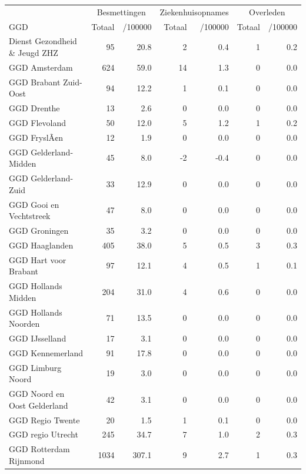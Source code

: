 \documentclass[
  english,
  man,floatsintext]{apa6}
\begin{document}
\begin{table}[H]
\centering\begingroup\fontsize{10}{12}\selectfont

\begin{threeparttable}
\begin{tabular}{lrrrrrr}
\toprule
\multicolumn{1}{c}{ } & \multicolumn{2}{c}{Besmettingen} & \multicolumn{2}{c}{Ziekenhuisopnames} & \multicolumn{2}{c}{Overleden} \\
\cmidrule(l{3pt}r{3pt}){2-3} \cmidrule(l{3pt}r{3pt}){4-5} \cmidrule(l{3pt}r{3pt}){6-7}
GGD & Totaal & /100000 & Totaal & /100000 & Totaal & /100000\\
\midrule
Dienst Gezondheid \& Jeugd ZHZ & 95 & 20.8 & 2 & 0.4 & 1 & 0.2\\
GGD Amsterdam & 624 & 59.0 & 14 & 1.3 & 0 & 0.0\\
GGD Brabant Zuid-Oost & 94 & 12.2 & 1 & 0.1 & 0 & 0.0\\
GGD Drenthe & 13 & 2.6 & 0 & 0.0 & 0 & 0.0\\
GGD Flevoland & 50 & 12.0 & 5 & 1.2 & 1 & 0.2\\
GGD FryslÃ¢n & 12 & 1.9 & 0 & 0.0 & 0 & 0.0\\
GGD Gelderland-Midden & 45 & 8.0 & -2 & -0.4 & 0 & 0.0\\
GGD Gelderland-Zuid & 33 & 12.9 & 0 & 0.0 & 0 & 0.0\\
GGD Gooi en Vechtstreek & 47 & 8.0 & 0 & 0.0 & 0 & 0.0\\
GGD Groningen & 35 & 3.2 & 0 & 0.0 & 0 & 0.0\\
GGD Haaglanden & 405 & 38.0 & 5 & 0.5 & 3 & 0.3\\
GGD Hart voor Brabant & 97 & 12.1 & 4 & 0.5 & 1 & 0.1\\
GGD Hollands Midden & 204 & 31.0 & 4 & 0.6 & 0 & 0.0\\
GGD Hollands Noorden & 71 & 13.5 & 0 & 0.0 & 0 & 0.0\\
GGD IJsselland & 17 & 3.1 & 0 & 0.0 & 0 & 0.0\\
GGD Kennemerland & 91 & 17.8 & 0 & 0.0 & 0 & 0.0\\
GGD Limburg Noord & 19 & 3.0 & 0 & 0.0 & 0 & 0.0\\
GGD Noord en Oost Gelderland & 42 & 3.1 & 0 & 0.0 & 0 & 0.0\\
GGD Regio Twente & 20 & 1.5 & 1 & 0.1 & 0 & 0.0\\
GGD regio Utrecht & 245 & 34.7 & 7 & 1.0 & 2 & 0.3\\
GGD Rotterdam Rijnmond & 1034 & 307.1 & 9 & 2.7 & 1 & 0.3\\

\end{tabular}
\end{threeparttable}
\end{table}
\end{document}
